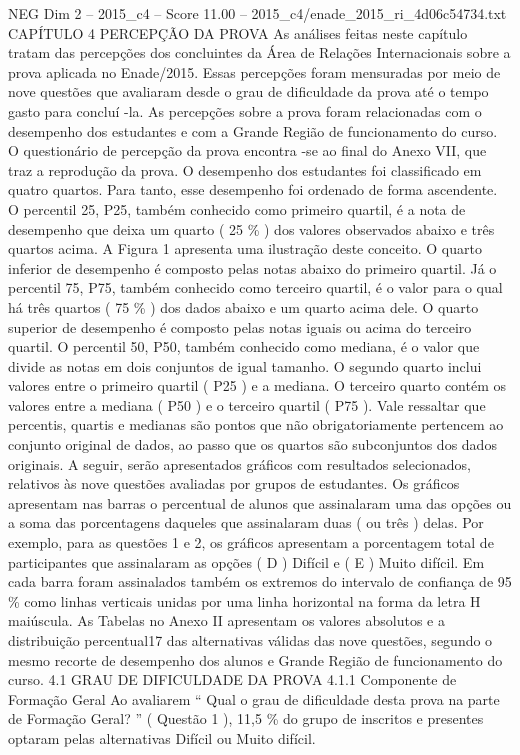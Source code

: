 \begin{textsample}{NEG Dim 2 – 2015\_c4 – Score 11.00 – 2015\_c4/enade\_2015\_ri\_4d06c54734.txt}  \label{ex:f2_neg_351}
CAPÍTULO 4 PERCEPÇÃO DA PROVA As análises feitas neste capítulo tratam das percepções dos concluintes da Área de Relações Internacionais sobre a prova aplicada no Enade/2015.
Essas percepções foram mensuradas por meio de nove questões que avaliaram desde o grau de dificuldade da prova até o tempo gasto para concluí -la.
As percepções sobre a prova foram relacionadas com o desempenho dos estudantes e com a Grande Região de funcionamento do curso.
O questionário de percepção da prova encontra -se ao final do Anexo VII, que traz a reprodução da prova.
O desempenho dos estudantes foi classificado em quatro quartos.
Para tanto, esse desempenho foi ordenado de forma ascendente.
O percentil 25, P25, também conhecido como primeiro quartil, é a nota de desempenho que deixa um quarto ( 25 \% ) dos valores observados abaixo e três quartos acima.
A Figura 1 apresenta uma ilustração deste conceito.
O quarto inferior de desempenho é composto pelas notas abaixo do primeiro quartil.
Já o percentil 75, P75, também conhecido como terceiro quartil, é o valor para o qual há três quartos ( 75 \% ) dos dados abaixo e um quarto acima dele.
O quarto superior de desempenho é composto pelas notas iguais ou acima do terceiro quartil.
O percentil 50, P50, também conhecido como mediana, é o valor que divide as notas em dois conjuntos de igual tamanho.
O segundo quarto inclui valores entre o primeiro quartil ( P25 ) e a mediana.
O terceiro quarto contém os valores entre a mediana ( P50 ) e o terceiro quartil ( P75 ).
Vale ressaltar que percentis, quartis e medianas são pontos que não obrigatoriamente pertencem ao conjunto original de dados, ao passo que os quartos são subconjuntos dos dados originais.
A seguir, serão apresentados gráficos com resultados selecionados, relativos às nove questões avaliadas por grupos de estudantes.
Os gráficos apresentam nas barras o percentual de alunos que assinalaram uma das opções ou a soma das porcentagens daqueles que assinalaram duas ( ou três ) delas.
Por exemplo, para as questões 1 e 2, os gráficos apresentam a porcentagem total de participantes que assinalaram as opções ( D ) Difícil e ( E ) Muito difícil.
Em cada barra foram assinalados também os extremos do intervalo de confiança de 95 \% como linhas verticais unidas por uma linha horizontal na forma da letra H maiúscula.
As Tabelas no Anexo II apresentam os valores absolutos e a distribuição percentual17 das alternativas válidas das nove questões, segundo o mesmo recorte de desempenho dos alunos e Grande Região de funcionamento do curso. 4.1 GRAU DE DIFICULDADE DA PROVA 4.1.1 Componente de Formação Geral Ao avaliarem “ Qual o grau de dificuldade desta prova na parte de Formação Geral? ” ( Questão 1 ), 11,5 \% do grupo de inscritos e presentes optaram pelas alternativas Difícil ou Muito difícil.

\end{textsample}
